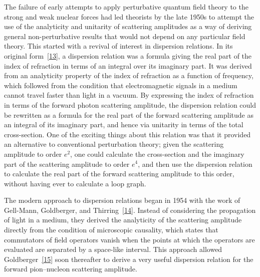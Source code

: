 The failure of early attempts to apply perturbative quantum field theory
to the strong and weak nuclear forces had led theorists by the late 1950s
to attempt the use of the analyticity and unitarity of scattering amplitudes
as a way of deriving general non-perturbative results that would not
depend on any particular field theory. This started with a revival of
interest in dispersion relations. In its original form~\hyperref[ref:10.13]{[13]},
a dispersion relation was a formula giving the real part of the index of
refraction in terms of an integral over its imaginary part. It was derived
from an analyticity property of the index of refraction as a function of
frequency, which followed from the condition that electromagnetic signals
in a medium cannot travel faster than light in a vacuum. By expressing
the index of refraction in terms of the forward photon scattering amplitude,
the dispersion relation could be rewritten as a formula for the real part of
the forward scattering amplitude as an integral of its imaginary part, and
hence via unitarity in terms of the total cross-section. One of the exciting
things about this relation was that it provided an alternative to conventional
perturbation theory; given the scattering amplitude to order $e^2$, one could
calculate the cross-section and the imaginary part of the scattering amplitude
to order $e^4$, and then use the dispersion relation to calculate the real
part of the forward scattering amplitude to this order, without having ever
to calculate a loop graph.

The modern approach to dispersion relations began in 1954 with the work
of Gell-Mann, Goldberger, and Thirring~\hyperref[ref:10.14]{[14]}. Instead
of considering the propagation of light in a medium, they derived the
analyticity of the scattering amplitude directly from the condition of
microscopic causality, which states that commutators of field operators vanish
when the points at which the operators are evaluated are separated by a
space-like interval. This approach allowed Goldberger~\hyperref[ref:10.15]{[15]}
soon thereafter to derive a very useful dispersion relation for the forward
pion--nucleon scattering amplitude.

